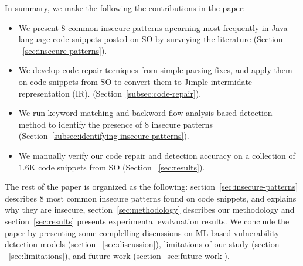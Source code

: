    
   In summary, we make the following the contributions in the paper: 
   \begin{itemize}
   \item We present 8 common insecure patterns apearning most frequently  in Java language code snippets posted on SO by surveying the literature (Section ~\ref{sec:insecure-patterns}).      
   \item We develop code repair tecniques from simple parsing fixes, and apply them on code snippets from SO to convert them to Jimple intermidate representation (IR). %
   (Section~\ref{subsec:code-repair}). 
   \item  We run keyword matching and backword flow analysis based detection method to identify the presence of 8 insecure patterns (Section~\ref{subsec:identifying-insecure-patterns}).
   \item We manually verify our code repair and detection accuracy on a collection of 1.6K code snippets from SO (Section ~\ref{sec:results}). 
   \end{itemize}

   The rest of the paper is organized as the following: section~\ref{sec:insecure-patterns} describes 8 most common insecure patterns found on code snippets, and explains why they are insecure, section~\ref{sec:methodology} describes our methodology and section~\ref{sec:results} presents experimental evalvuation results. We conclude the paper by presenting some complelling discussions on ML based vulnerability detection models (section ~\ref{sec:discussion}), limitations of our study (section ~\ref{sec:limitations}), and future work (section~\ref{sec:future-work}).

   

